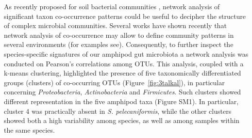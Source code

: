 As recently proposed for soil bacterial communities \cite{barberan2011using}, network analysis of significant taxon co-occurrence patterns could be useful to decipher the structure of complex microbial communities. Several works have shown recently that network analysis of co-occurrence may allow to define community patterns in several environments (for examples \cite{berry2014deciphering, boutin2014inter, williams2014demonstrating, geng2014co} see). Consequently, to further inspect the species-specific signatures of our amphipod gut microbiota a network analysis was conducted on Pearson's correlations among OTUs. This analysis, coupled with a k-means clustering, highlighted the presence of five taxonomically differentiated groups (clusters) of co-occurring OTUs (Figure~\ref{fig:3talkal}), in particular concerning \textit{Proteobacteria}, \textit{Actinobacteria} and \textit{Firmicutes}. Such clusters showed different representation in the five amphipod taxa (Figure SM1). In particular, cluster 4 was practically absent in \textit{S. pelecaniformis}, while the other clusters showed both a high variability among species, as well as among samples within the same species.\\
